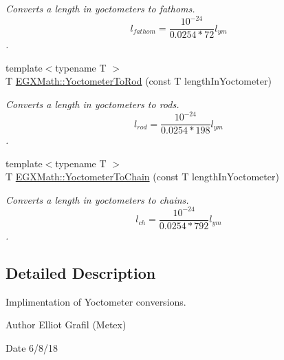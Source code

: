 \begin{DoxyCompactItemize}
\begin{DoxyCompactList}\small\item\em Converts a length in yoctometers to fathoms. \[ l_{fathom}= \frac{10^{-24}}{0.0254 * 72} l_{ym} \]. \end{DoxyCompactList}\item 
{\footnotesize template$<$typename T $>$ }\\T \mbox{\hyperlink{group___e_g_x_math-_conversions-_length_conversions-_s_i-_yoctometer-_surveyors_gaabe3a5aaa7081b0489d25f0b2117c11b}{E\+G\+X\+Math\+::\+Yoctometer\+To\+Rod}} (const T length\+In\+Yoctometer)
\begin{DoxyCompactList}\small\item\em Converts a length in yoctometers to rods. \[ l_{rod}= \frac{10^{-24}}{0.0254 * 198} l_{ym} \]. \end{DoxyCompactList}\item 
{\footnotesize template$<$typename T $>$ }\\T \mbox{\hyperlink{group___e_g_x_math-_conversions-_length_conversions-_s_i-_yoctometer-_surveyors_ga982ac95d1a3ac5e02e983e355af983d0}{E\+G\+X\+Math\+::\+Yoctometer\+To\+Chain}} (const T length\+In\+Yoctometer)
\begin{DoxyCompactList}\small\item\em Converts a length in yoctometers to chains. \[ l_{ch}= \frac{10^{-24}}{0.0254 * 792} l_{ym} \]. \end{DoxyCompactList}\end{DoxyCompactItemize}


\subsection{Detailed Description}
Implimentation of Yoctometer conversions. 

\begin{DoxyAuthor}{Author}
Elliot Grafil (Metex) 
\end{DoxyAuthor}
\begin{DoxyDate}{Date}
6/8/18 
\end{DoxyDate}
